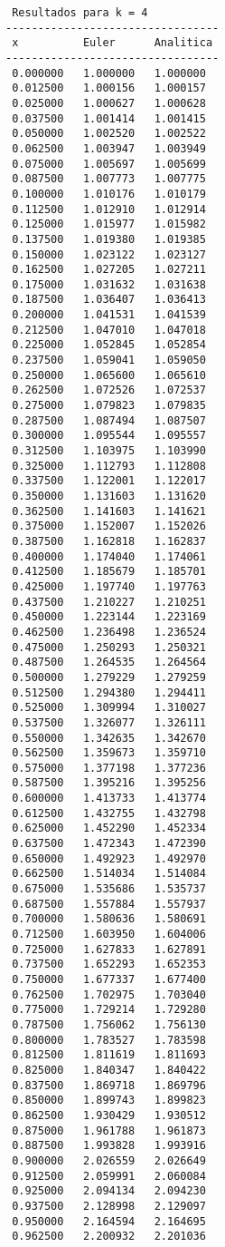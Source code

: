 \begin{verbatim}
 Resultados para k = 4
---------------------------------
 x          Euler      Analitica
---------------------------------
 0.000000   1.000000   1.000000
 0.012500   1.000156   1.000157
 0.025000   1.000627   1.000628
 0.037500   1.001414   1.001415
 0.050000   1.002520   1.002522
 0.062500   1.003947   1.003949
 0.075000   1.005697   1.005699
 0.087500   1.007773   1.007775
 0.100000   1.010176   1.010179
 0.112500   1.012910   1.012914
 0.125000   1.015977   1.015982
 0.137500   1.019380   1.019385
 0.150000   1.023122   1.023127
 0.162500   1.027205   1.027211
 0.175000   1.031632   1.031638
 0.187500   1.036407   1.036413
 0.200000   1.041531   1.041539
 0.212500   1.047010   1.047018
 0.225000   1.052845   1.052854
 0.237500   1.059041   1.059050
 0.250000   1.065600   1.065610
 0.262500   1.072526   1.072537
 0.275000   1.079823   1.079835
 0.287500   1.087494   1.087507
 0.300000   1.095544   1.095557
 0.312500   1.103975   1.103990
 0.325000   1.112793   1.112808
 0.337500   1.122001   1.122017
 0.350000   1.131603   1.131620
 0.362500   1.141603   1.141621
 0.375000   1.152007   1.152026
 0.387500   1.162818   1.162837
 0.400000   1.174040   1.174061
 0.412500   1.185679   1.185701
 0.425000   1.197740   1.197763
 0.437500   1.210227   1.210251
 0.450000   1.223144   1.223169
 0.462500   1.236498   1.236524
 0.475000   1.250293   1.250321
 0.487500   1.264535   1.264564
 0.500000   1.279229   1.279259
 0.512500   1.294380   1.294411
 0.525000   1.309994   1.310027
 0.537500   1.326077   1.326111
 0.550000   1.342635   1.342670
 0.562500   1.359673   1.359710
 0.575000   1.377198   1.377236
 0.587500   1.395216   1.395256
 0.600000   1.413733   1.413774
 0.612500   1.432755   1.432798
 0.625000   1.452290   1.452334
 0.637500   1.472343   1.472390
 0.650000   1.492923   1.492970
 0.662500   1.514034   1.514084
 0.675000   1.535686   1.535737
 0.687500   1.557884   1.557937
 0.700000   1.580636   1.580691
 0.712500   1.603950   1.604006
 0.725000   1.627833   1.627891
 0.737500   1.652293   1.652353
 0.750000   1.677337   1.677400
 0.762500   1.702975   1.703040
 0.775000   1.729214   1.729280
 0.787500   1.756062   1.756130
 0.800000   1.783527   1.783598
 0.812500   1.811619   1.811693
 0.825000   1.840347   1.840422
 0.837500   1.869718   1.869796
 0.850000   1.899743   1.899823
 0.862500   1.930429   1.930512
 0.875000   1.961788   1.961873
 0.887500   1.993828   1.993916
 0.900000   2.026559   2.026649
 0.912500   2.059991   2.060084
 0.925000   2.094134   2.094230
 0.937500   2.128998   2.129097
 0.950000   2.164594   2.164695
 0.962500   2.200932   2.201036

\end{verbatim}
